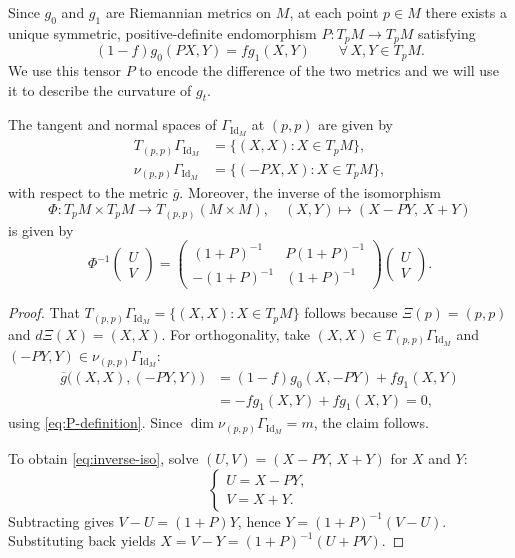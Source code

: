 \documentclass[graybox]{svmult}
\begin{document}
Since $g_0$ and $g_1$ are Riemannian metrics on $M$, at each point $p\in M$ there exists a unique symmetric, positive-definite endomorphism $P : T_pM \to T_pM$ satisfying
\begin{equation}\label{eq:P-definition}
(1-f)g_0(PX,Y) = fg_1(X,Y) \qquad \forall\, X,Y\in T_pM.
\end{equation}
We use this tensor $P$ to encode the difference of the two metrics and we will use it to describe the curvature of $g_t$.
\begin{lemma}\label{lem:tangent-normal}
The tangent and normal spaces of $\Gamma_{\operatorname{Id}_M}$ at $(p,p)$ are given by
\begin{align*}
T_{(p,p)}\Gamma_{\operatorname{Id}_M} &= \{(X,X) : X\in T_pM\}, \\
\nu_{(p,p)}\Gamma_{\operatorname{Id}_M} &= \{(-PX,X) : X\in T_pM\},
\end{align*}
with respect to the metric $\overline{g}$. Moreover, the inverse of the isomorphism
\[
\Phi : T_pM\times T_pM \to T_{(p,p)}(M\times M), \quad (X,Y) \mapsto (X-PY,\, X+Y)
\]
is given by
\begin{equation}\label{eq:inverse-iso}
\Phi^{-1}\begin{pmatrix}U\\V\end{pmatrix} = 
\begin{pmatrix}
(1+P)^{-1} & P(1+P)^{-1} \\[2pt]
-(1+P)^{-1} & (1+P)^{-1}
\end{pmatrix}
\begin{pmatrix}U\\V\end{pmatrix}.
\end{equation}
\end{lemma}

\begin{proof}
That $T_{(p,p)}\Gamma_{\operatorname{Id}_M} = \{(X,X) : X\in T_pM\}$ follows because $\Xi(p)=(p,p)$ and $d\Xi(X)=(X,X)$. For orthogonality, take $(X,X)\in T_{(p,p)}\Gamma_{\operatorname{Id}_M}$ and $(-PY,Y)\in \nu_{(p,p)}\Gamma_{\operatorname{Id}_M}$:
\begin{align*}
\overline{g}\big((X,X),(-PY,Y)\big) 
&= (1-f)g_0(X,-PY) + fg_1(X,Y) \\
&= -fg_1(X,Y) + fg_1(X,Y) = 0,
\end{align*}
using \eqref{eq:P-definition}. Since $\dim\nu_{(p,p)}\Gamma_{\operatorname{Id}_M} = m$, the claim follows.

To obtain \eqref{eq:inverse-iso}, solve $(U,V) = (X-PY,\, X+Y)$ for $X$ and $Y$:
\[
\begin{cases}
U = X - PY, \\
V = X + Y.
\end{cases}
\]
Subtracting gives $V-U = (1+P)Y$, hence $Y = (1+P)^{-1}(V-U)$. Substituting back yields $X = V - Y = (1+P)^{-1}(U+PV)$.
\end{proof}
\end{document}
